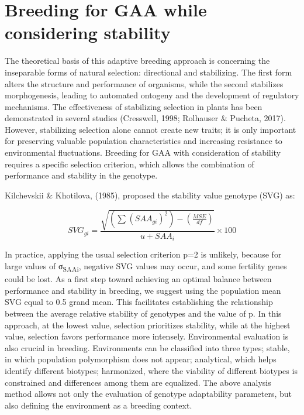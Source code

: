 \documentclass[
]{article}
\begin{document}
\hypertarget{breeding-for-gaa-while-considering-stability}{%
\section{Breeding for GAA while considering
stability}\label{breeding-for-gaa-while-considering-stability}}

The theoretical basis of this adaptive breeding approach is concerning
the inseparable forms of natural selection: directional and stabilizing.
The first form alters the structure and performance of organisms, while
the second stabilizes morphogenesis, leading to automated ontogeny and
the development of regulatory mechanisms. The effectiveness of
stabilizing selection in plants has been demonstrated in several studies
(Cresswell, 1998; Rolhauser \& Pucheta, 2017). However, stabilizing
selection alone cannot create new traits; it is only important for
preserving valuable population characteristics and increasing resistance
to environmental fluctuations. Breeding for GAA with consideration of
stability requires a specific selection criterion, which allows the
combination of performance and stability in the genotype.

Kilchevskii \& Khotilova, (1985), proposed the stability value genotype
(SVG) as:

\[{SVG}_{gi} = \frac{\sqrt{\left( \sum_{}^{}{({SAA}_{gi})}^{2} \right) - (\frac{MSE}{df})}}{u + {SAA}_{i}} \times 100\]

In practice, applying the usual selection criterion p=2 is unlikely,
because for large values of σ\textsubscript{SAAi}, negative SVG values
may occur, and some fertility genes could be lost. As a first step
toward achieving an optimal balance between performance and stability in
breeding, we suggest using the population mean SVG equal to 0.5 grand
mean. This facilitates establishing the relationship between the average
relative stability of genotypes and the value of p. In this approach, at
the lowest value, selection prioritizes stability, while at the highest
value, selection favors performance more intensely. Environmental
evaluation is also crucial in breeding. Environments can be classified
into three types; stable, in which population polymorphism does not
appear; analytical, which helps identify different biotypes; harmonized,
where the viability of different biotypes is constrained and differences
among them are equalized. The above analysis method allows not only the
evaluation of genotype adaptability parameters, but also defining the
environment as a breeding context.
\end{document}
